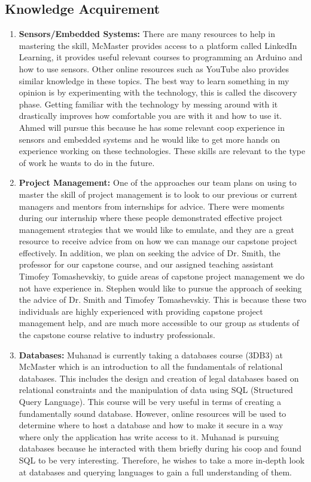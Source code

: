 \documentclass[12pt,titlepage]{article}
\begin{document}
\newpage

\subsection{Knowledge Acquirement }

\begin{enumerate}
  \item \textbf{Sensors/Embedded Systems:} There are many resources to help in mastering the skill, McMaster provides access to a platform called LinkedIn Learning, it provides useful relevant courses to programming an Arduino and how to use sensors. Other online resources such as YouTube also provides similar knowledge in these topics. The best way to learn something in my opinion is by experimenting with the technology, this is called the discovery phase. Getting familiar with the technology by messing around with it drastically improves how comfortable you are with it and how to use it. Ahmed will pursue this because he has some relevant coop experience in sensors and embedded systems and he would like to get more hands on experience working on these technologies. These skills are relevant to the type of work he wants to do in the future.
  
  \item \textbf{Project Management:} One of the approaches our team plans on using to master the skill of project management is to look to our previous or current managers and mentors from internships for advice. There were moments during our internship where these people demonstrated effective project management strategies that we would like to emulate, and they are a great resource to receive advice from on how we can manage our capstone project effectively. In addition, we plan on seeking the advice of Dr. Smith, the professor for our capstone course, and our assigned teaching assistant Timofey Tomashevskiy, to guide areas of capstone project management we do not have experience in. Stephen would like to pursue the approach of seeking the advice of Dr. Smith and Timofey Tomashevskiy. This is because these two individuals are highly experienced with providing capstone project management help, and are much more accessible to our group as students of the capstone course relative to industry professionals.  
  
  \item \textbf{Databases:} Muhanad is currently taking a databases course (3DB3) at McMaster which is an introduction to all the fundamentals of relational databases. This includes the design and creation of legal databases based on relational constraints and the manipulation of data using SQL (Structured Query Language). This course will be very useful in terms of creating a fundamentally sound database. However, online resources will be used to determine where to host a database and how to make it secure in a way where only the application has write access to it. Muhanad is pursuing databases because he interacted with them briefly during his coop and found SQL to be very interesting. Therefore, he wishes to take a more in-depth look at databases and querying languages to gain a full understanding of them.
  

\end{enumerate}
\end{document}
